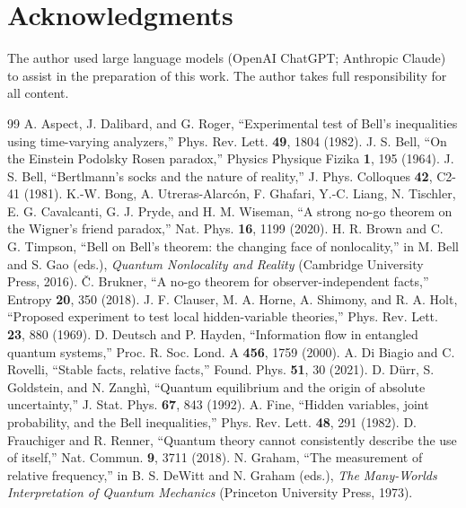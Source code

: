 \documentclass[11pt]{article}
\theoremstyle{definition}
\theoremstyle{remark}
\begin{document}
\section*{Acknowledgments}
The author used large language models (OpenAI ChatGPT; Anthropic Claude) to assist in the preparation of this work. The author takes full responsibility for all content.

\begin{thebibliography}{99}\small
{} A. Aspect, J. Dalibard, and G. Roger, ``Experimental test of Bell's inequalities using time-varying analyzers,'' Phys. Rev. Lett. \textbf{49}, 1804 (1982).
 J. S. Bell, ``On the Einstein Podolsky Rosen paradox,'' Physics Physique Fizika \textbf{1}, 195 (1964).
 J. S. Bell, ``Bertlmann's socks and the nature of reality,'' J. Phys. Colloques \textbf{42}, C2-41 (1981).
 K.-W. Bong, A. Utreras-Alarc\'on, F. Ghafari, Y.-C. Liang, N. Tischler, E. G. Cavalcanti, G. J. Pryde, and H. M. Wiseman, ``A strong no-go theorem on the Wigner's friend paradox,'' Nat. Phys. \textbf{16}, 1199 (2020).
 H. R. Brown and C. G. Timpson, ``Bell on Bell's theorem: the changing face of nonlocality,'' in M. Bell and S. Gao (eds.), \emph{Quantum Nonlocality and Reality} (Cambridge University Press, 2016).
 \v{C}. Brukner, ``A no-go theorem for observer-independent facts,'' Entropy \textbf{20}, 350 (2018).
 J. F. Clauser, M. A. Horne, A. Shimony, and R. A. Holt, ``Proposed experiment to test local hidden-variable theories,'' Phys. Rev. Lett. \textbf{23}, 880 (1969).
 D. Deutsch and P. Hayden, ``Information flow in entangled quantum systems,'' Proc. R. Soc. Lond. A \textbf{456}, 1759 (2000).
 A. Di Biagio and C. Rovelli, ``Stable facts, relative facts,'' Found. Phys. \textbf{51}, 30 (2021).
 D. D\"urr, S. Goldstein, and N. Zangh\`i, ``Quantum equilibrium and the origin of absolute uncertainty,'' J. Stat. Phys. \textbf{67}, 843 (1992).
 A. Fine, ``Hidden variables, joint probability, and the Bell inequalities,'' Phys. Rev. Lett. \textbf{48}, 291 (1982).
 D. Frauchiger and R. Renner, ``Quantum theory cannot consistently describe the use of itself,'' Nat. Commun. \textbf{9}, 3711 (2018).
 N. Graham, ``The measurement of relative frequency,'' in B. S. DeWitt and N. Graham (eds.), \emph{The Many-Worlds Interpretation of Quantum Mechanics} (Princeton University Press, 1973).

\end{thebibliography}
\end{document}
